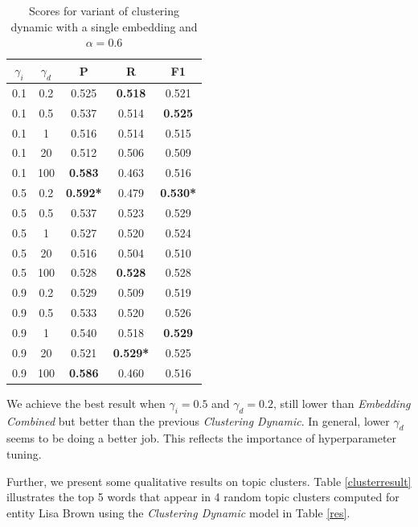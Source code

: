 \documentclass{article}
\begin{document}
\begin{table}[H]
\center
\begin{tabular}{|c|c|c|c|c|} \hline
$\gamma_i$ & $\gamma_d$ & \textbf{P} & \textbf{R} & \textbf{F1} \\ \hline\hline
0.1 & 0.2 & 0.525 & \textbf{0.518} & 0.521 \\ \hline
0.1 & 0.5 & 0.537 & 0.514 & \textbf{0.525} \\ \hline
0.1 & 1   & 0.516 & 0.514 & 0.515 \\ \hline
0.1 & 20  & 0.512 & 0.506 & 0.509 \\ \hline
0.1 & 100 & \textbf{0.583} & 0.463 & 0.516 \\ \hline\hline
0.5 & 0.2 & \textbf{0.592*} & 0.479 & \textbf{0.530*} \\ \hline
0.5 & 0.5 & 0.537 & 0.523 & 0.529 \\ \hline
0.5 & 1   & 0.527 & 0.520 & 0.524 \\ \hline
0.5 & 20  & 0.516 & 0.504 & 0.510 \\ \hline
0.5 & 100 & 0.528 & \textbf{0.528} & 0.528 \\ \hline\hline
0.9 & 0.2 & 0.529 & 0.509 & 0.519 \\ \hline
0.9 & 0.5 & 0.533 & 0.520 & 0.526 \\ \hline
0.9 & 1   & 0.540 & 0.518 & \textbf{0.529} \\ \hline
0.9 & 20  & 0.521 & \textbf{0.529*} & 0.525 \\ \hline
0.9 & 100 & \textbf{0.586} & 0.460 & 0.516 \\ \hline
\end{tabular}
\caption{Scores for variant of clustering dynamic with a single embedding and $\alpha=0.6$}
\label{varyinggamma}
\end{table}

We achieve the best result when $\gamma_i=0.5$ and $\gamma_d=0.2$, still lower than \textit{Embedding Combined} but better than the previous {\textit{Clustering Dynamic}}. In general, lower $\gamma_d$ seems to be doing a better job. This reflects the importance of hyperparameter tuning.

Further, we present some qualitative results on topic clusters. Table \ref{clusterresult} illustrates the top 5 words that appear in 4 random topic clusters computed for entity Lisa Brown using the \textit{Clustering Dynamic} model in Table \ref{res}.
\end{document}
